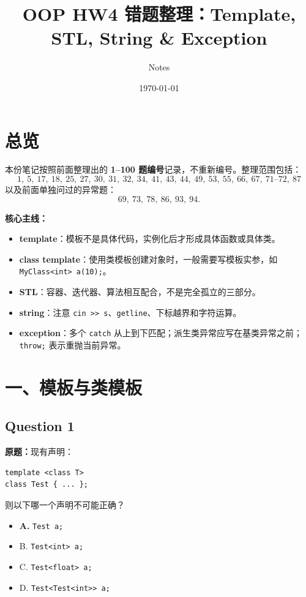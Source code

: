 \documentclass[11pt, a4paper]{article}
\title{OOP HW4 错题整理：Template, STL, String \& Exception}
\author{Notes}
\date{\today}
\begin{document}
\maketitle

\section*{总览}

本份笔记按照前面整理出的 \textbf{1--100 题编号}记录，不重新编号。整理范围包括：
\[
1,\ 5,\ 17,\ 18,\ 25,\ 27,\ 30,\ 31,\ 32,\ 34,\ 41,\ 43,\ 44,\ 49,\ 53,\ 55,\ 66,\ 67,\ 71\text{--}72,\ 87
\]
以及前面单独问过的异常题：
\[
69,\ 73,\ 78,\ 86,\ 93,\ 94.
\]

\bigskip

\noindent \textbf{核心主线：}
\begin{itemize}
    \item \textbf{template}：模板不是具体代码，实例化后才形成具体函数或具体类。
    \item \textbf{class template}：使用类模板创建对象时，一般需要写模板实参，如 \texttt{MyClass<int> a(10);}。
    \item \textbf{STL}：容器、迭代器、算法相互配合，不是完全孤立的三部分。
    \item \textbf{string}：注意 \texttt{cin >> s}、\texttt{getline}、下标越界和字符运算。
    \item \textbf{exception}：多个 \texttt{catch} 从上到下匹配；派生类异常应写在基类异常之前；\texttt{throw;} 表示重抛当前异常。
\end{itemize}


\section*{一、模板与类模板}

\subsection*{Question 1}
\textbf{原题：}现有声明：
\begin{lstlisting}
template <class T>
class Test { ... };
\end{lstlisting}
则以下哪一个声明不可能正确？
\begin{itemize}
    \item \textbf{A.} \texttt{Test a;}
    \item B. \texttt{Test<int> a;}
    \item C. \texttt{Test<float> a;}
    \item D. \texttt{Test<Test<int>> a;}
\end{itemize}
\end{document}
